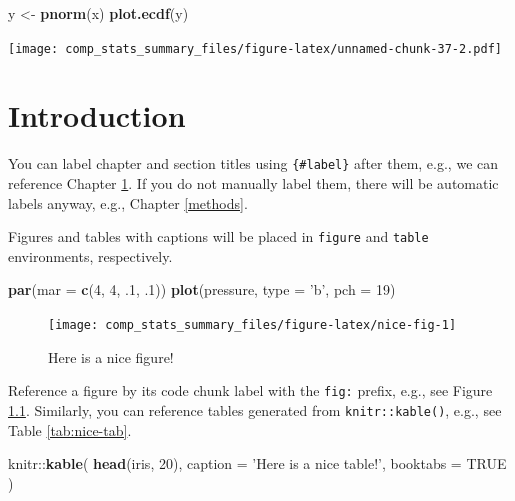 \documentclass[]{book}
\newenvironment{Shaded}{\begin{snugshade}}{\end{snugshade}}
\newcommand{\KeywordTok}[1]{\textcolor[rgb]{0.13,0.29,0.53}{\textbf{{#1}}}}
\newcommand{\DataTypeTok}[1]{\textcolor[rgb]{0.13,0.29,0.53}{{#1}}}
\newcommand{\DecValTok}[1]{\textcolor[rgb]{0.00,0.00,0.81}{{#1}}}
\newcommand{\StringTok}[1]{\textcolor[rgb]{0.31,0.60,0.02}{{#1}}}
\newcommand{\OtherTok}[1]{\textcolor[rgb]{0.56,0.35,0.01}{{#1}}}
\newcommand{\NormalTok}[1]{{#1}}
\begin{document}
\begin{Shaded}
\begin{Highlighting}[]
\NormalTok{y <-}\StringTok{ }\KeywordTok{pnorm}\NormalTok{(x)}
\KeywordTok{plot.ecdf}\NormalTok{(y)}
\end{Highlighting}
\end{Shaded}

\texttt{[image: comp\_stats\_summary\_files/figure-latex/unnamed-chunk-37-2.pdf]}

\chapter{Introduction}\label{intro}

You can label chapter and section titles using \texttt{\{\#label\}}
after them, e.g., we can reference Chapter \ref{intro}. If you do not
manually label them, there will be automatic labels anyway, e.g.,
Chapter \ref{methods}.

Figures and tables with captions will be placed in \texttt{figure} and
\texttt{table} environments, respectively.

\begin{Shaded}
\begin{Highlighting}[]
\KeywordTok{par}\NormalTok{(}\DataTypeTok{mar =} \KeywordTok{c}\NormalTok{(}\DecValTok{4}\NormalTok{, }\DecValTok{4}\NormalTok{, .}\DecValTok{1}\NormalTok{, .}\DecValTok{1}\NormalTok{))}
\KeywordTok{plot}\NormalTok{(pressure, }\DataTypeTok{type =} \StringTok{'b'}\NormalTok{, }\DataTypeTok{pch =} \DecValTok{19}\NormalTok{)}
\end{Highlighting}
\end{Shaded}

\begin{figure}

{\centering \texttt{[image: comp\_stats\_summary\_files/figure-latex/nice-fig-1]} 

}

\caption{Here is a nice figure!}\label{fig:nice-fig}
\end{figure}

Reference a figure by its code chunk label with the \texttt{fig:}
prefix, e.g., see Figure \ref{fig:nice-fig}. Similarly, you can
reference tables generated from \texttt{knitr::kable()}, e.g., see Table
\ref{tab:nice-tab}.

\begin{Shaded}
\begin{Highlighting}[]
\NormalTok{knitr::}\KeywordTok{kable}\NormalTok{(}
  \KeywordTok{head}\NormalTok{(iris, }\DecValTok{20}\NormalTok{), }\DataTypeTok{caption =} \StringTok{'Here is a nice table!'}\NormalTok{,}
  \DataTypeTok{booktabs =} \OtherTok{TRUE}
\NormalTok{)}
\end{Highlighting}
\end{Shaded}
\end{document}
